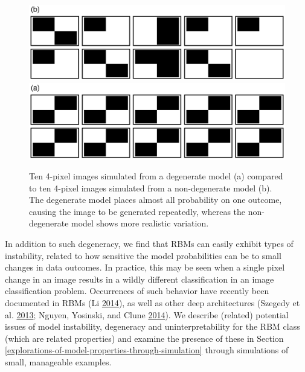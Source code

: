 \documentclass[]{article}
\theoremstyle{definition}
\begin{document}
\par
\begin{figure}
\includegraphics[width=1\linewidth]{paper_files/figure-latex/sample-models-1} \includegraphics[width=1\linewidth]{paper_files/figure-latex/sample-models-2} \caption{Ten 4-pixel images simulated from a degenerate model (a) compared to ten 4-pixel images simulated from a non-degenerate model (b). The degenerate model places almost all probability on one outcome, causing the image to be generated repeatedly, whereas the non-degenerate model shows more realistic variation.}\label{fig:sample-models}
\end{figure}
In addition to such degeneracy, we find that RBMs can easily exhibit
types of instability, related to how sensitive the model probabilities
can be to small changes in data outcomes. In practice, this may be seen
when a single pixel change in an image results in a wildly different
classification in an image classification problem. Occurrences of such
behavior have recently been documented in RBMs (Li
\protect\hyperlink{ref-li2014biclustering}{2014}), as well as other deep
architectures (Szegedy et al.
\protect\hyperlink{ref-szegedy2013intriguing}{2013}; Nguyen, Yosinski,
and Clune \protect\hyperlink{ref-nguyen2014deep}{2014}). We describe
(related) potential issues of model instability, degeneracy and
uninterpretability for the RBM class (which are related properties) and
examine the presence of these in Section
\ref{explorations-of-model-properties-through-simulation} through
simulations of small, manageable examples.
\end{document}
